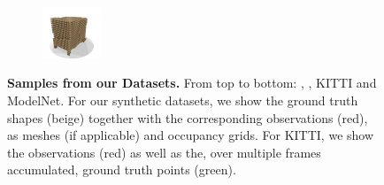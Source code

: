 \begin{figure}
\begin{subfigure}[t]{0.115\textwidth}
    \end{subfigure}
    \begin{subfigure}[t]{0.115\textwidth}
        \vspace{0px}
        \centering
        \includegraphics[width=1.75cm,trim={1cm 0cm 0.75cm 1cm},clip]{gfx/experiments_modelnet/vae_occ_aml/bdmnsf.clean.25.small.weighted/target/00019}
    \end{subfigure}
    \caption{{\bf Samples from our Datasets.} From top to bottom: \clean, \noisy, KITTI and ModelNet. For our synthetic datasets, we show the ground truth shapes ({\color{rbeige}beige}) together with the corresponding observations ({\color{rred}red}), as meshes (if applicable) and occupancy grids. For KITTI, we show the observations ({\color{rred}red}) as well as the, over multiple frames accumulated, ground truth points ({\color{rgreen}green}).}
    \label{fig:appendix-experiments-data}
\end{figure}